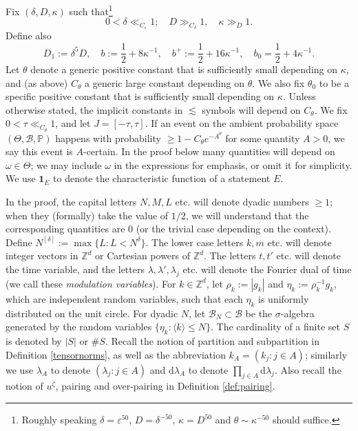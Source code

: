 \documentclass[11 pt,reqno]{amsart}
\theoremstyle{definition}
\theoremstyle{remark}
\numberwithin{equation}{section}
\newcommand{\Bc}{\mathcal{B}}
\newcommand{\Zb}{\mathbb{Z}}
\newcommand{\Pb}{\mathbb{P}}
\begin{document}
{ Fix $(\delta,D,\kappa)$ such that\footnote{Roughly speaking $\delta=\varepsilon^{50}$, $D=\delta^{-50}$, $\kappa=D^{50}$ and $\theta\sim \kappa^{-50}$ should suffice.}
 \begin{equation}\label{defdelta} 0<\delta\ll_{C_\varepsilon}1;\quad D\gg_{C_\delta}1,\quad \kappa\gg_D1.
 \end{equation} Define also \begin{equation}\label{defb}D_1:=\delta^5D,\quad b:=\frac{1}{2}+8\kappa^{-1},\quad b^+:=\frac{1}{2}+16\kappa^{-1},\quad b_0=\frac{1}{2}+4\kappa^{-1}.\end{equation} Let $\theta$ denote a generic positive constant that is sufficiently small depending on $\kappa$, and (as above) $C_\theta$ a generic large constant depending on $\theta$. We also fix $\theta_0$ to be a specific positive constant that is sufficiently small depending on $\kappa$. Unless otherwise stated, the implicit constants in $\lesssim$ symbols will depend on $C_\theta$.  We fix $0<\tau\ll_{C_\theta}1$, and let $J=[-\tau,\tau]$. If an event on the ambient probability space $(\Theta,\Bc,\Pb)$ happens with probability $\geq 1-C_\theta e^{-A^\theta}$ for some quantity $A>0$, we say this event is $A$-certain. In the proof below many quantities will depend on $\omega\in\Theta$; we may include $\omega$ in the expressions for emphasis, or omit it for simplicity. We use $\mathbf{1}_E$ to denote the characteristic function of a statement $E$.
 
In the proof, the capital letters $N, M, L$ etc. will denote dyadic numbers $\geq 1$; when they (formally) take the value of $1/2$, we will understand that the corresponding quantities are $0$ (or the trivial case depending on the context). Define $N^{[\delta]}:=\max\{L:L<N^\delta\}$. The lower case letters $k,m$ etc. will denote integer vectors in $\Zb^d$ or Cartesian powers of $\Zb^d$. The letters $t,t'$ etc. will denote the time variable, and the letters $\lambda,\lambda',\lambda_j$ etc. will denote the Fourier dual of time (we call these \emph{modulation variables}). For $k\in\Zb^d$, let $\rho_k:=|g_k|$ and $\eta_k:=\rho_k^{-1}g_k$, which are independent random variables, such that each $\eta_k$ is uniformly distributed on the unit circle. For dyadic $N$, let $\Bc_N\subset\Bc$ be the $\sigma$-algebra generated by the random variables $\{\eta_k:\langle k\rangle\leq N\}$. The cardinality of a finite set $S$ is denoted by $|S|$ or $\#S$. Recall the notion of partition and subpartition in Definition \ref{tensornorms}, as well as the abbreviation $k_A=(k_j:j\in A)$; similarly we use $\lambda_A$ to denote $(\lambda_j:j\in A)$ and $\mathrm{d}\lambda_A$ to denote $\prod_{j\in A}\mathrm{d}\lambda_j$. Also recall the notion of $u^\zeta$, pairing and over-pairing in Definition \ref{def:pairing}.

}
\end{document}
